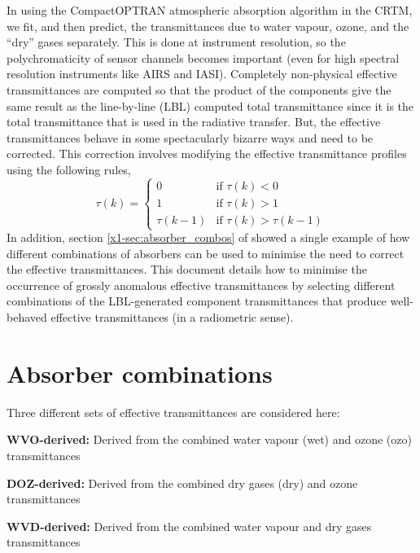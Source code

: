 In using the CompactOPTRAN atmospheric absorption algorithm in the CRTM, we fit, and then predict, the transmittances due to water vapour, ozone, and the ``dry'' gases separately. This is done at instrument resolution, so the polychromaticity of sensor channels becomes important (even for high spectral resolution instruments like AIRS and IASI). Completely non-physical effective transmittances are computed so that the product of the components give the same result as the line-by-line (LBL) computed total transmittance since it is the total transmittance that is used in the radiative transfer. But, the effective transmittances behave in some spectacularly bizarre ways and need to be corrected. This correction involves modifying the effective transmittance profiles using the following rules,
\begin{equation}
  \tau(k) = \begin{cases}
               0         & \textrm{if } \tau(k) < 0\\
               1         & \textrm{if } \tau(k) > 1\\
               \tau(k-1) & \textrm{if } \tau(k) > \tau(k-1)
            \end{cases}
  \label{eqn:fix_efftau}
\end{equation}
In addition, section \ref{x1-sec:absorber_combos} of \cite{CRTM_IASI_Transmittance} showed a single example of how different combinations of absorbers can be used to minimise the need to correct the effective transmittances. This document details how to minimise the occurrence of grossly anomalous effective transmittances by selecting different combinations of the LBL-generated component transmittances that produce well-behaved effective transmittances (in a radiometric sense). 


\section{Absorber combinations}
Three different sets of effective transmittances are considered here:
\begin{list}{\bfseries}
  {\setlength{\labelwidth}{1.2in}
   \setlength{\leftmargin}{1.2in}
   \setlength{\labelsep}{0.1in}
   \setlength{\parsep}{0.5ex plus0.2ex minus0.1ex}
   \setlength{\itemsep}{0ex plus0.2ex}}
  \item[\bfseries WVO-derived:] Derived from the combined water vapour (wet) and ozone (ozo) transmittances
  \item[\bfseries DOZ-derived:] Derived from the combined dry gases (dry) and ozone transmittances
  \item[\bfseries WVD-derived:] Derived from the combined water vapour and dry gases transmittances
\end{list}

